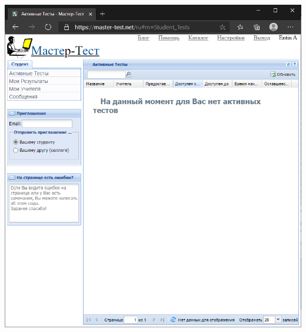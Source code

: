 \documentclass[
  12pt,
]{book}
\begin{document}
\begin{enumerate}
  \includegraphics{./images/instruction/007.png}
\end{enumerate}

  
\end{document}
